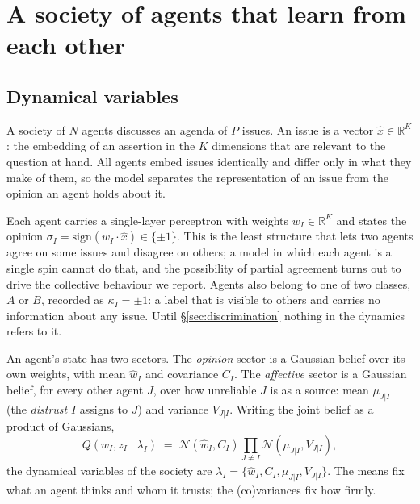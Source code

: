 \section{A society of agents that learn from each other}
\label{sec:model}

\subsection{Dynamical variables}
\label{sec:variables}

A society of $N$ agents discusses an agenda of $P$ issues. An issue is a vector
$\hat{x}\in\mathbb{R}^{K}$: the embedding of an assertion in the $K$ dimensions
that are relevant to the question at hand. All agents embed issues identically and
differ only in what they make of them, so the model separates the representation of
an issue from the opinion an agent holds about it.

Each agent carries a single-layer perceptron with weights $w_I\in\mathbb{R}^{K}$
and states the opinion $\sigma_I = \mathrm{sign}(w_I\cdot\hat{x})\in\{\pm 1\}$.
This is the least structure that lets two agents agree on some issues and disagree
on others; a model in which each agent is a single spin cannot do that, and the
possibility of partial agreement turns out to drive the collective behaviour we
report. Agents also belong to one of two classes, $A$ or $B$, recorded as
$\kappa_I=\pm1$: a label that is visible to others and carries no information about
any issue. Until \S\ref{sec:discrimination} nothing in the dynamics refers to it.

An agent's state has two sectors. The \emph{opinion} sector is a Gaussian belief
over its own weights, with mean $\hat{w}_I$ and covariance $C_I$. The
\emph{affective} sector is a Gaussian belief, for every other agent $J$, over how
unreliable $J$ is as a source: mean $\mu_{J|I}$ (the \emph{distrust} $I$ assigns to
$J$) and variance $V_{J|I}$. Writing the joint belief as a product of Gaussians,
%
\begin{equation}
  Q(w_I, z_I \mid \lambda_I) \;=\; \mathcal{N}(\hat{w}_I, C_I)
  \prod_{J\neq I}\mathcal{N}(\mu_{J|I}, V_{J|I}),
  \label{eq:belief}
\end{equation}
%
the dynamical variables of the society are
$\lambda_I=\{\hat{w}_I, C_I, \mu_{J|I}, V_{J|I}\}$. The means fix what an agent
thinks and whom it trusts; the (co)variances fix how firmly.

